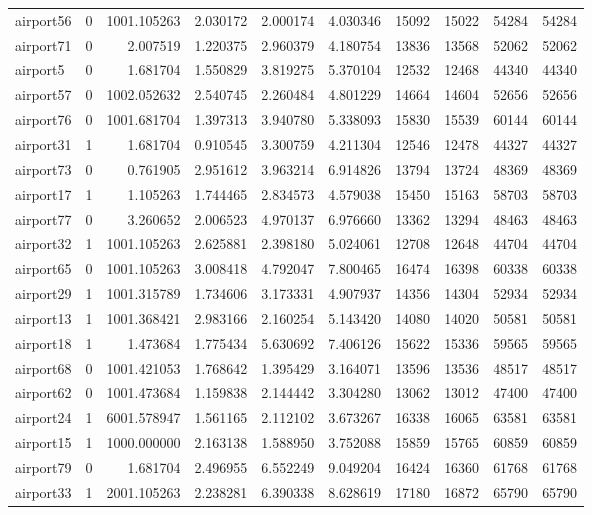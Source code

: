 \begin{longtable}{|l|r|r|r|r|r|r|r|r|r|}
airport56 & 0 & 1001.105263 & 2.030172 & 2.000174 & 4.030346 & 15092 & 15022 & 54284 & 54284 \\
airport71 & 0 & 2.007519 & 1.220375 & 2.960379 & 4.180754 & 13836 & 13568 & 52062 & 52062 \\
airport5 & 0 & 1.681704 & 1.550829 & 3.819275 & 5.370104 & 12532 & 12468 & 44340 & 44340 \\
airport57 & 0 & 1002.052632 & 2.540745 & 2.260484 & 4.801229 & 14664 & 14604 & 52656 & 52656 \\
airport76 & 0 & 1001.681704 & 1.397313 & 3.940780 & 5.338093 & 15830 & 15539 & 60144 & 60144 \\
airport31 & 1 & 1.681704 & 0.910545 & 3.300759 & 4.211304 & 12546 & 12478 & 44327 & 44327 \\
airport73 & 0 & 0.761905 & 2.951612 & 3.963214 & 6.914826 & 13794 & 13724 & 48369 & 48369 \\
airport17 & 1 & 1.105263 & 1.744465 & 2.834573 & 4.579038 & 15450 & 15163 & 58703 & 58703 \\
airport77 & 0 & 3.260652 & 2.006523 & 4.970137 & 6.976660 & 13362 & 13294 & 48463 & 48463 \\
airport32 & 1 & 1001.105263 & 2.625881 & 2.398180 & 5.024061 & 12708 & 12648 & 44704 & 44704 \\
airport65 & 0 & 1001.105263 & 3.008418 & 4.792047 & 7.800465 & 16474 & 16398 & 60338 & 60338 \\
airport29 & 1 & 1001.315789 & 1.734606 & 3.173331 & 4.907937 & 14356 & 14304 & 52934 & 52934 \\
airport13 & 1 & 1001.368421 & 2.983166 & 2.160254 & 5.143420 & 14080 & 14020 & 50581 & 50581 \\
airport18 & 1 & 1.473684 & 1.775434 & 5.630692 & 7.406126 & 15622 & 15336 & 59565 & 59565 \\
airport68 & 0 & 1001.421053 & 1.768642 & 1.395429 & 3.164071 & 13596 & 13536 & 48517 & 48517 \\
airport62 & 0 & 1001.473684 & 1.159838 & 2.144442 & 3.304280 & 13062 & 13012 & 47400 & 47400 \\
airport24 & 1 & 6001.578947 & 1.561165 & 2.112102 & 3.673267 & 16338 & 16065 & 63581 & 63581 \\
airport15 & 1 & 1000.000000 & 2.163138 & 1.588950 & 3.752088 & 15859 & 15765 & 60859 & 60859 \\
airport79 & 0 & 1.681704 & 2.496955 & 6.552249 & 9.049204 & 16424 & 16360 & 61768 & 61768 \\
airport33 & 1 & 2001.105263 & 2.238281 & 6.390338 & 8.628619 & 17180 & 16872 & 65790 & 65790 \\

\end{longtable}
